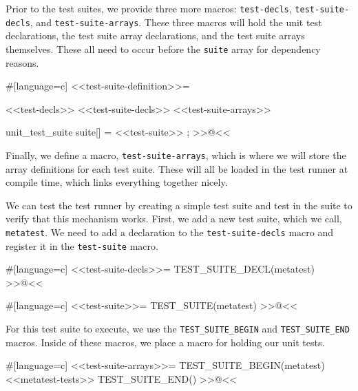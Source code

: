 Prior to the test suites, we provide three more macros: \verb/test-decls/,
\verb/test-suite-decls/, and \verb/test-suite-arrays/.  These three macros will
hold the unit test declarations, the test suite array declarations, and the test
suite arrays themselves.  These all need to occur before the \verb/suite/ array
for dependency reasons.

#[language=c]
<<test-suite-definition>>=

<<test-decls>>
<<test-suite-decls>>
<<test-suite-arrays>>

unit_test_suite suite[] =
{
    <<test-suite>>
};
>>@<<

Finally, we define a macro, \verb/test-suite-arrays/, which is where we will
store the array definitions for each test suite.  These will all be loaded in
the test runner at compile time, which links everything together nicely.

We can test the test runner by creating a simple test suite and test in the
suite to verify that this mechanism works.  First, we add a new test suite,
which we call, \verb/metatest/. We need to add a declaration to the
\verb/test-suite-decls/ macro and register it in the \verb/test-suite/ macro.

#[language=c]
<<test-suite-decls>>=
TEST_SUITE_DECL(metatest)
>>@<<

#[language=c]
<<test-suite>>=
TEST_SUITE(metatest)
>>@<<

For this test suite to execute, we use the \verb/TEST_SUITE_BEGIN/ and
\verb/TEST_SUITE_END/ macros. Inside of these macros, we place a macro for
holding our unit tests.

#[language=c]
<<test-suite-arrays>>=
TEST_SUITE_BEGIN(metatest)
<<metatest-tests>>
TEST_SUITE_END()
>>@<<

